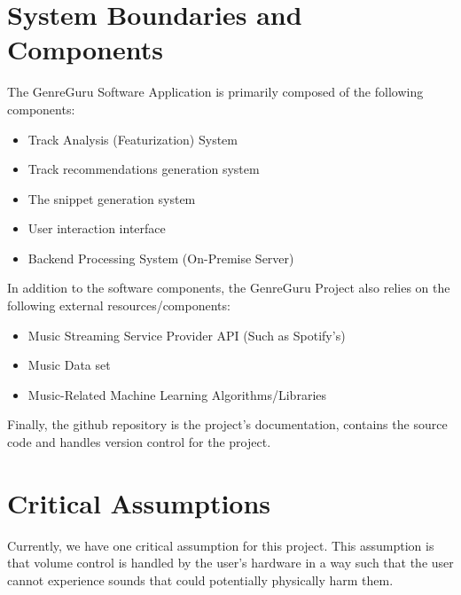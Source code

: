 \documentclass{article}
\begin{document}
\section{System Boundaries and Components}


The GenreGuru Software Application is primarily composed of the following components: 
\begin{itemize}
\item Track Analysis (Featurization) System
\item Track recommendations generation system
\item The snippet generation system
\item User interaction interface
\item Backend Processing System (On-Premise Server)
\end{itemize}
In addition to the software components, the GenreGuru Project also relies on the following 
external resources/components:
\begin{itemize}
    \item Music Streaming Service Provider API (Such as Spotify's)
    \item Music Data set
    \item Music-Related Machine Learning Algorithms/Libraries
\end{itemize}
Finally, the github repository is the project's documentation, contains the source code
and handles version control for the project. 
\section{Critical Assumptions}


Currently, we have one critical assumption for this project. This assumption is that volume control
is handled by the user's hardware in a way such that the user cannot experience sounds that 
could potentially physically harm them. 
\end{document}
